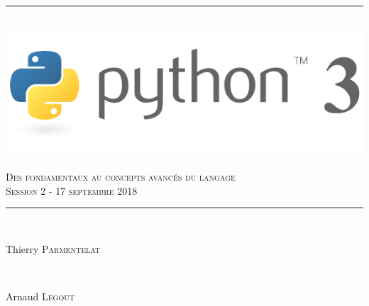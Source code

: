 \documentclass[11pt, a4paper, french
]{book}
\makeatletter
\def\maxwidth{\ifdim\Gin@nat@width>\linewidth\linewidth
    \else\Gin@nat@width\fi}
\let\Oldincludegraphics\includegraphics
\renewcommand{\includegraphics}[1]{\Oldincludegraphics[width=.8\maxwidth]{#1}}
\makeatother
\begin{document}
     

    
  \begin{titlepage}

\newcommand{\HRule}{\rule{\linewidth}{0.5mm}} %

\center %
 


\HRule \\[0.4cm]
\includegraphics{medias/logo1.png}

 \textsc{\Large Des fondamentaux au concepts avancés du langage}\\
 \textsc{Session 2 - 17 septembre 2018}
\HRule \\[0.4cm]


\begin{minipage}{0.4\textwidth}
\begin{flushleft} \large
Thierry \textsc{Parmentelat}
\end{flushleft}
\end{minipage}
~
\begin{minipage}{0.4\textwidth}
\begin{flushright} \large
Arnaud \textsc{Legout}
\end{flushright}
\end{minipage}\\[1.5cm]



\end{titlepage}
\end{document}
